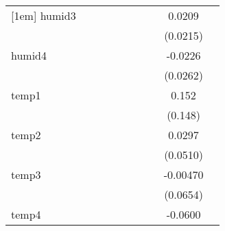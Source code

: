 {\begin{tabular}{l*{9}{c}}
[1em]
humid3      &                     &                     &                     &                     &                     &                     &                     &      0.0209         &                     \\
            &                     &                     &                     &                     &                     &                     &                     &    (0.0215)         &                     \\
[1em]
humid4      &                     &                     &                     &                     &                     &                     &                     &     -0.0226         &                     \\
            &                     &                     &                     &                     &                     &                     &                     &    (0.0262)         &                     \\
[1em]
temp1       &                     &                     &                     &                     &                     &                     &                     &       0.152         &                     \\
            &                     &                     &                     &                     &                     &                     &                     &     (0.148)         &                     \\
[1em]
temp2       &                     &                     &                     &                     &                     &                     &                     &      0.0297         &                     \\
            &                     &                     &                     &                     &                     &                     &                     &    (0.0510)         &                     \\
[1em]
temp3       &                     &                     &                     &                     &                     &                     &                     &    -0.00470         &                     \\
            &                     &                     &                     &                     &                     &                     &                     &    (0.0654)         &                     \\
[1em]
temp4       &                     &                     &                     &                     &                     &                     &                     &     -0.0600         &                     \\

\end{tabular}}
